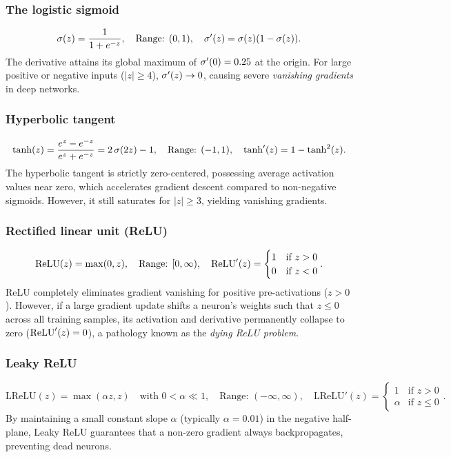 \documentclass[../../main.tex]{subfiles}
\begin{document}
\subsubsection{The logistic sigmoid}
\begin{equation}
\label{eq:sigmoid_def}
\operatorname{\sigma}(z) = \frac{1}{1 + e^{-z}}, \quad \text{Range: } (0, 1), \quad \operatorname{\sigma}'(z) = \operatorname{\sigma}(z)(1 - \operatorname{\sigma}(z)).
\end{equation}
The derivative attains its global maximum of $\operatorname{\sigma}'(0) = 0.25$ at the origin. For large positive or negative inputs ($|z| \ge 4$), $\operatorname{\sigma}'(z) \to 0$, causing severe \emph{vanishing gradients} in deep networks.

\subsubsection{Hyperbolic tangent}
\begin{equation}
\label{eq:tanh_def}
\tanh(z) = \frac{e^z - e^{-z}}{e^z + e^{-z}} = 2\operatorname{\sigma}(2z) - 1, \quad \text{Range: } (-1, 1), \quad \tanh'(z) = 1 - \tanh^2(z).
\end{equation}
The hyperbolic tangent is strictly zero-centered, possessing average activation values near zero, which accelerates gradient descent compared to non-negative sigmoids. However, it still saturates for $|z| \ge 3$, yielding vanishing gradients.

\subsubsection{Rectified linear unit (ReLU)}
\begin{equation}
\label{eq:relu_def}
\operatorname{\mathrm{ReLU}}(z) = \max(0, z), \quad \text{Range: } [0, \infty), \quad \operatorname{\mathrm{ReLU}}'(z) = \begin{cases} 1 & \text{if } z > 0 \\ 0 & \text{if } z < 0 \end{cases}.
\end{equation}
ReLU completely eliminates gradient vanishing for positive pre-activations ($z > 0$). However, if a large gradient update shifts a neuron's weights such that $z \le 0$ across all training samples, its activation and derivative permanently collapse to zero ($\operatorname{\mathrm{ReLU}}'(z) = 0$), a pathology known as the \emph{dying ReLU problem}.

\subsubsection{Leaky ReLU}
\begin{equation}
\label{eq:leaky_relu_def}
\text{LReLU}(z) = \max(\alpha z, z) \quad \text{with } 0 < \alpha \ll 1, \quad \text{Range: } (-\infty, \infty), \quad \text{LReLU}'(z) = \begin{cases} 1 & \text{if } z > 0 \\ \alpha & \text{if } z \le 0 \end{cases}.
\end{equation}
By maintaining a small constant slope $\alpha$ (typically $\alpha = 0.01$) in the negative half-plane, Leaky ReLU guarantees that a non-zero gradient always backpropagates, preventing dead neurons.
\end{document}
